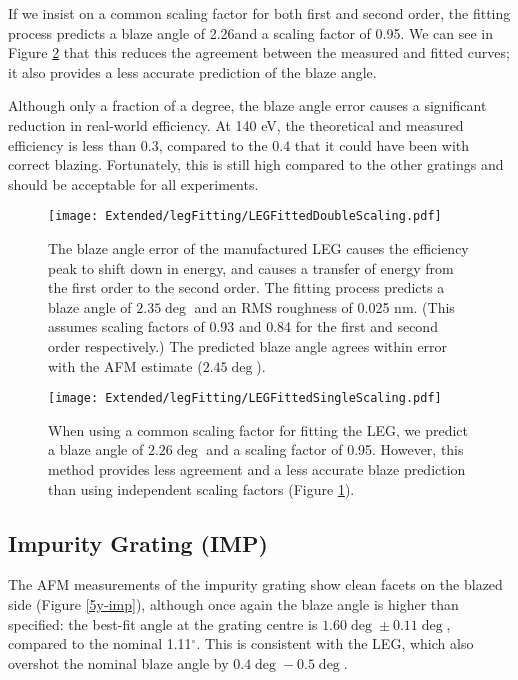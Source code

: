 If we insist on a common scaling factor for both first and second order, the fitting process predicts a blaze angle of 2.26\dg and a scaling factor of 0.95.  We can see in Figure \ref{LEGSingleScaling} that this reduces the agreement between the measured and fitted curves; it also provides a less accurate prediction of the blaze angle.

Although only a fraction of a degree, the blaze angle error causes a significant reduction in real-world efficiency.  At 140 eV, the theoretical and measured efficiency is less than 0.3, compared to the 0.4 that it could have been with correct blazing.  Fortunately, this is still high compared to the other gratings and should be acceptable for all experiments.

\begin{figure}[htbp] %
   \centering
   \texttt{[image: Extended/legFitting/LEGFittedDoubleScaling.pdf]} 
   \caption{The blaze angle error of the manufactured LEG causes the efficiency peak to shift down in energy, and causes a transfer of energy from the first order to the second order.  The fitting process predicts a blaze angle of $2.35\deg$ and an RMS roughness of 0.025 nm.  (This assumes scaling factors of 0.93 and 0.84 for the first and second order respectively.)  The predicted blaze angle agrees within error with the AFM estimate ($2.45\deg$).}
   \label{5x-leg}
\end{figure}

\begin{figure}[htbp] %
   \centering
   \texttt{[image: Extended/legFitting/LEGFittedSingleScaling.pdf]} 
   \caption{When using a common scaling factor for fitting the LEG, we predict a blaze angle of $2.26\deg$ and a scaling factor of 0.95.  However, this method provides less agreement and a less accurate blaze prediction than using independent scaling factors (Figure \ref{5x-leg}).}
   \label{LEGSingleScaling}
\end{figure}

\subsection{Impurity Grating (IMP)}
The AFM measurements of the impurity grating show clean facets on the blazed side (Figure \ref{5y-imp}), although once again the blaze angle is higher than specified: the best-fit angle at the grating centre is $1.60\deg \pm 0.11\deg$, compared to the nominal 1.11$^\circ$.  This is consistent with the LEG, which also overshot the nominal blaze angle by $0.4\deg - 0.5\deg$.

